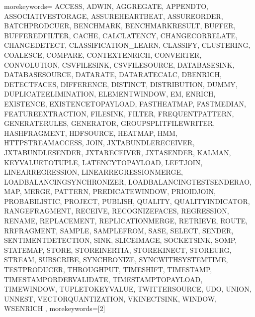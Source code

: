 
%
   {morekeywords={%
ACCESS, ADWIN, AGGREGATE, APPENDTO, ASSOCIATIVESTORAGE, ASSUREHEARTBEAT, ASSUREORDER, BATCHPRODCUER, BENCHMARK, BENCHMARKRESULT, BUFFER, BUFFEREDFILTER, CACHE, CALCLATENCY, CHANGECORRELATE, CHANGEDETECT, CLASSIFICATION_LEARN, CLASSIFY, CLUSTERING, COALESCE, COMPARE, CONTEXTENRICH, CONVERTER, CONVOLUTION, CSVFILESINK, CSVFILESOURCE, DATABASESINK, DATABASESOURCE, DATARATE, DATARATECALC, DBENRICH, DETECTFACES, DIFFERENCE, DISTINCT, DISTRIBUTION, DUMMY, DUPLICATEELIMINATION, ELEMENTWINDOW, EM, ENRICH, EXISTENCE, EXISTENCETOPAYLOAD, FASTHEATMAP, FASTMEDIAN, FEATUREEXTRACTION, FILESINK, FILTER, FREQUENTPATTERN, GENERATERULES, GENERATOR, GROUPSPLITFILEWRITER, HASHFRAGMENT, HDFSOURCE, HEATMAP, HMM, HTTPSTREAMACCESS, JOIN, JXTABUNDLERECEIVER, JXTABUNDLESENDER, JXTARECEIVER, JXTASENDER, KALMAN, KEYVALUETOTUPLE, LATENCYTOPAYLOAD, LEFTJOIN, LINEARREGRESSION, LINEARREGRESSIONMERGE, LOADBALANCINGSYNCHRONIZER, LOADBALANCINGTESTSENDERAO, MAP, MERGE, PATTERN, PREDICATEWINDOW, PRIOIDJOIN, PROBABILISTIC, PROJECT, PUBLISH, QUALITY, QUALITYINDICATOR, RANGEFRAGMENT, RECEIVE, RECOGNIZEFACES, REGRESSION, RENAME, REPLACEMENT, REPLICATIONMERGE, RETRIEVE, ROUTE, RRFRAGMENT, SAMPLE, SAMPLEFROM, SASE, SELECT, SENDER, SENTIMENTDETECTION, SINK, SLICEIMAGE, SOCKETSINK, SOMP, STATEMAP, STORE, STOREINERTIA, STOREKINECT, STOREURG, STREAM, SUBSCRIBE, SYNCHRONIZE, SYNCWITHSYSTEMTIME, TESTPRODUCER, THROUGHPUT, TIMESHIFT, TIMESTAMP, TIMESTAMPORDERVALIDATE, TIMESTAMPTOPAYLOAD, TIMEWINDOW, TUPLETOKEYVALUE, TWITTERSOURCE, UDO, UNION, UNNEST, VECTORQUANTIZATION, VKINECTSINK, WINDOW, WSENRICH%
      },%
   morekeywords=[2]{%
}}
